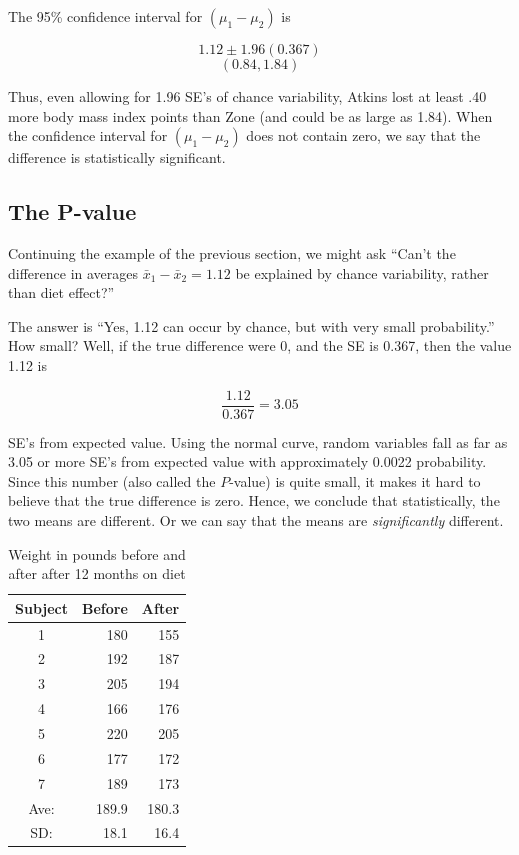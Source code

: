 \documentclass[11pt, chapterprefix=true]{scrbook}\usepackage[]{graphicx}\usepackage[]{color}
\begin{document}
The 95\% confidence interval for $(\mu_1 - \mu_2)$ is

\begin{equation*}
  1.12 \pm 1.96 (0.367)
\end{equation*}
\begin{equation*}
(0.84, 1.84)
\end{equation*}

Thus, even allowing for 1.96 SE's of chance variability, Atkins lost at least .40 more body mass index points than Zone (and could be as large as 1.84).   When the confidence interval for $(\mu_1 - \mu_2)$  does not contain zero, we say that the difference is statistically significant.  

\subsection{The P-value}

Continuing the example of the previous section, we might ask ``Can't the difference in averages $\bar{x}_1 - \bar{x}_2 = 1.12$ be explained by chance variability, rather than diet effect?''

The answer is ``Yes, 1.12 can occur by chance, but with very small probability.''  How small? Well, if the true difference were 0, and the SE is 0.367, then the value 1.12 is

\begin{equation*}
\frac{1.12}{0.367} = 3.05
\end{equation*}

SE's from expected value.  Using the normal curve, random variables fall as far as 3.05 or more SE's from expected value with approximately 0.0022 probability.  Since this number (also called the $P$-value) is quite small, it makes it hard to believe that the true difference is zero.  Hence, we conclude that statistically, the two means are different.  Or we can say that the means are \textit{significantly} different.

\begin{table}[ht]
\centering
\caption{Weight in pounds before and after after 12 months on diet}
\begin{tabular}{@{} crr @{}} \hline
Subject & Before & After \\ \hline
1 & 180 & 155 \\
2 & 192 & 187 \\
3 & 205 & 194 \\
4 & 166 & 176 \\
5 & 220 & 205 \\
6 & 177 & 172 \\
7 & 189 & 173 \\ \hline
Ave: & 189.9 & 180.3 \\
SD:  & 18.1 & 16.4 \\ \hline
\end{tabular}
\end{table}
\end{document}
